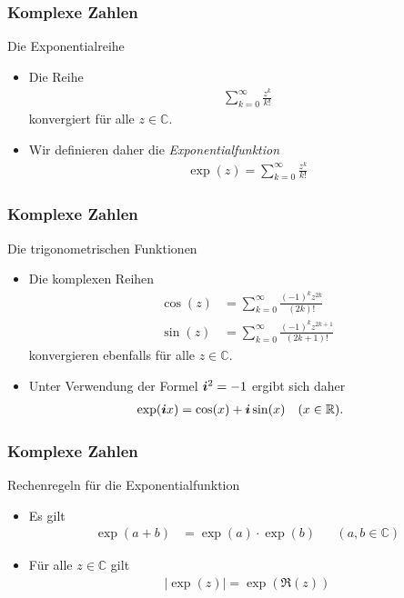 \documentclass{beamer}
\def\vec#1{\mathchoice{\mbox{\boldmath$\displaystyle#1$}}
{\mbox{\boldmath$\textstyle#1$}}
{\mbox{\boldmath$\scriptstyle#1$}}
{\mbox{\boldmath$\scriptscriptstyle#1$}}}
\renewcommand{\emph}[1]{{\textcolor{solarizedRed}{\itshape #1}}}
\newcommand\ii{\vec i}
\newcommand\RR{\mathbb R}
\newcommand\CC{\mathbb C}
\newcommand{\ue}{\"u}
\newcommand{\mytitle}{Komplexe Zahlen}
\begin{document}
\begin{frame}\frametitle{\mytitle}
	\begin{block}{Die Exponentialreihe}
		\begin{itemize}
			\item Die Reihe
				\begin{align*}
					\sum_{k=0}^\infty\frac{z^k}{k!}
				\end{align*}
				konvergiert f\ue r alle $z\in\CC$.
			\item Wir definieren daher die \emph{Exponentialfunktion}
				\begin{align*}
				 \exp(z)=	\sum_{k=0}^\infty\frac{z^k}{k!}
				\end{align*}
		\end{itemize}
	\end{block}
\end{frame}

\begin{frame}\frametitle{\mytitle}
	\begin{block}{Die trigonometrischen Funktionen}
		\begin{itemize}
			\item Die komplexen Reihen
				\begin{align*}
					\cos(z)&=\sum_{k=0}^\infty\frac{(-1)^kz^{2k}}{(2k)!}\\
					\sin(z)&=\sum_{k=0}^\infty\frac{(-1)^kz^{2k+1}}{(2k+1)!}
				\end{align*}
				konvergieren ebenfalls f\ue r alle $z\in\CC$.
			\item Unter Verwendung der Formel $\ii^2=-1$ ergibt sich daher
				\begin{align*}
					\exp(\ii x)&=\cos(x)+\ii\sin(x)&&(x\in\RR).
				\end{align*}
		\end{itemize}
	\end{block}
\end{frame}

\begin{frame}\frametitle{\mytitle}
	\begin{block}{Rechenregeln f\ue r die Exponentialfunktion}
		\begin{itemize}
			\item Es gilt
				\begin{align*}
					\exp(a+b)&=\exp(a)\cdot\exp(b)&&(a,b\in\CC)
				\end{align*}
			\item F\ue r alle $z\in\CC$ gilt
				\begin{align*}
					|\exp(z)|=\exp(\Re(z))
				\end{align*}
		\end{itemize}
	\end{block}
\end{frame}
\end{document}
